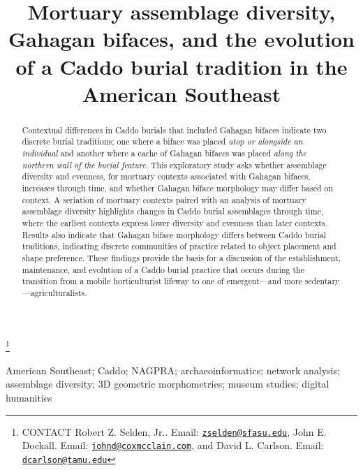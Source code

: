 \documentclass[]{interact}
\theoremstyle{plain}%
\theoremstyle{definition}
\theoremstyle{remark}
\begin{document}

\title{Mortuary assemblage diversity, Gahagan bifaces, and the evolution
of a Caddo burial tradition in the American Southeast}


\author{
}

\thanks{CONTACT Robert Z. Selden,
Jr.. Email: \href{mailto:zselden@sfasu.edu}{\nolinkurl{zselden@sfasu.edu}}, John
E.
Dockall. Email: \href{mailto:johnd@coxmcclain.com}{\nolinkurl{johnd@coxmcclain.com}}, and
David L.
Carlson. Email: \href{mailto:dcarlson@tamu.edu}{\nolinkurl{dcarlson@tamu.edu}}}

\maketitle

\begin{abstract}
Contextual differences in Caddo burials that included Gahagan bifaces
indicate two discrete burial traditions; one where a biface was placed
\emph{atop or alongside an individual} and another where a cache of
Gahagan bifaces was placed \emph{along the northern wall of the burial
feature}. This exploratory study asks whether assemblage diversity and
evenness, for mortuary contexts associated with Gahagan bifaces,
increases through time, and whether Gahagan biface morphology may differ
based on context. A seriation of mortuary contexts paired with an
analysis of mortuary assemblage diversity highlights changes in Caddo
burial assemblages through time, where the earliest contexts express
lower diversity and evenness than later contexts. Results also indicate
that Gahagan biface morphology differs between Caddo burial traditions,
indicating discrete communities of practice related to object placement
and shape preference. These findings provide the basis for a discussion
of the establishment, maintenance, and evolution of a Caddo burial
practice that occurs during the transition from a mobile horticulturist
lifeway to one of emergent---and more sedentary---agriculturalists.
\end{abstract}

\begin{keywords}
American Southeast; Caddo; NAGPRA; archaeoinformatics; network analysis;
assemblage diversity; 3D geometric morphometrics; museum studies;
digital humanities
\end{keywords}
\end{document}
